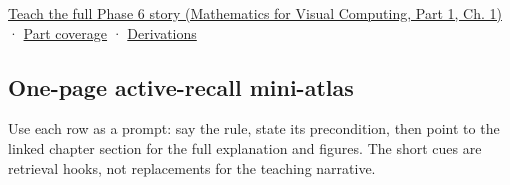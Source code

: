 \href{../02-Mathematics-for-Visual-Computing-P01/main.pdf\#01-foundations-i-ch017-the-panel-gives-us-a-reason-to-learn}{Teach the full Phase 6 story (Mathematics for Visual Computing, Part 1, Ch. 1)} · \hyperref[appendix-fd090d982a15-phase-6---parts-501-600]{Part coverage} · \hyperref[02-foundations-ii-ch039-phase-6---geometry-reconstruction-proofs]{Derivations}

\subsection{One-page active-recall mini-atlas}\label{appendix-38d9c8aca357-one-page-active-recall-mini-atlas}

\hypertarget{appendix-38d9c8aca357-one-page-active-recall-mini-atlas}{}

Use each row as a prompt: say the rule, state its precondition, then point to the linked chapter section for the full explanation and figures. The short cues are retrieval hooks, not replacements for the teaching narrative.

